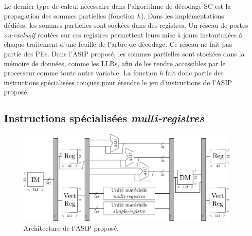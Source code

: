 Le dernier type de calcul nécessaire dans l'algorithme de décodage SC est la propagation des sommes partielles (fonction $h$). Dans les implémentations dédiées, les sommes partielles sont sockées dans des registres. Un réseau de portes \textit{ou-exclusif} routées sur ces registres permettent leurs mise à jours instantanées à chaque traitement d'une feuille de l'arbre de décodage. Ce réseau ne fait pas partie des PEs. Dans l'ASIP proposé, les sommes partielles sont stockées dans la mémoire de données, comme les LLRs, afin de les rendre accessibles par le processeur comme toute autre variable. La fonction $h$ fait donc partie des instructions spécialisées conçues pour étendre le jeu d'instructions de l'ASIP proposé.






\subsection{Instructions spécialisées \textit{multi-registres}}
\label{subsec:multi_reg}

\begin{figure}
\centering
\includegraphics[width=\textwidth]{main/ch3_fig/full_tensilica}
\caption{Architecture de l'ASIP proposé.}
\label{fig:full_tensilica}
\end{figure}

